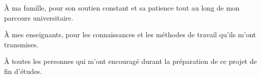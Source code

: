 \begin{center}
    \vspace*{1cm}
    À ma famille, pour son soutien constant et sa patience tout au long de mon parcours universitaire.

    \vspace{0.5cm}

    À mes enseignants, pour les connaissances et les méthodes de travail qu'ils m'ont transmises.

    \vspace{0.5cm}

    À toutes les personnes qui m'ont encouragé durant la préparation de ce projet de fin d'études.
\end{center}
